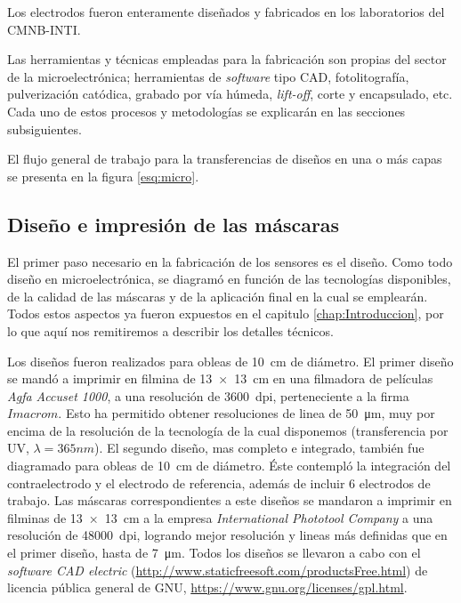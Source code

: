 	 Los electrodos fueron enteramente diseñados y fabricados en los laboratorios del CMNB-INTI. 
		
	 Las herramientas y técnicas empleadas para la fabricación son propias del sector de la microelectrónica; herramientas de \textit{software} tipo CAD, fotolitografía, pulverización catódica, grabado por vía húmeda, \textit{lift-off}, corte y encapsulado, etc.\cite{Franssila2004,Jaeger2001} Cada uno de estos procesos y metodologías se explicarán en las secciones subsiguientes. 

	 El flujo general de trabajo para la transferencias de diseños en una o más capas se presenta en la figura \ref{esq:micro}.
			  
	\subsection{Diseño e impresión de las máscaras}\label{sec:impresion_mascaras}

		El primer paso necesario en la fabricación de los sensores es el diseño. Como todo diseño en microelectrónica, se diagramó en función de las tecnologías disponibles, de la calidad de las máscaras y de la aplicación final en la cual se emplearán. Todos estos aspectos ya fueron expuestos en el capitulo \ref{chap:Introduccion}, por lo que aquí nos remitiremos a describir los detalles técnicos.

		Los diseños fueron realizados para obleas de \SI{10}{\cm} de diámetro. El primer diseño se mandó a imprimir en filmina de \SI{13x13}{\cm} en una filmadora de películas \textit{Agfa Accuset 1000}, a una resolución de \SI{3600}{dpi}, perteneciente a la firma $Imacrom$. Esto ha permitido obtener resoluciones de linea de \SI{50}{\um}, muy por encima de la resolución de la tecnología de la cual disponemos (transferencia por UV, $\lambda=365nm$). El segundo diseño, mas completo e integrado, también fue diagramado para obleas de \SI{10}{\cm} de diámetro. Éste contempló la integración del contraelectrodo y el electrodo de referencia, además de incluir 6 electrodos de trabajo. Las máscaras correspondientes a este diseños se mandaron a imprimir en filminas de \SI{13x13}{\cm} a la empresa \textit{International Phototool Company} a una resolución de \SI{48000}{dpi}, logrando mejor resolución y lineas más definidas que en el primer diseño, hasta de \SI{7}{\um}. Todos los diseños se llevaron a cabo con el \textit{software CAD electric} (\url{http://www.staticfreesoft.com/productsFree.html}) de licencia pública general de GNU, \url{https://www.gnu.org/licenses/gpl.html}. 
				
